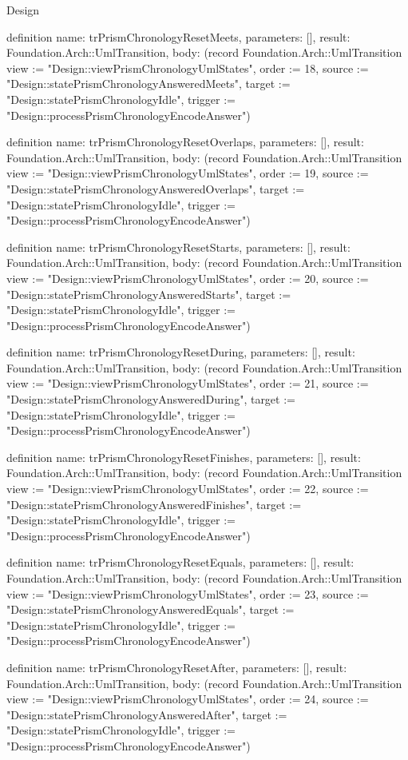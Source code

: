\begin{lexlean}{Design}
\begin{semanticmodule}
definition{
  name: trPrismChronologyResetMeets,
  parameters: [],
  result: Foundation.Arch::UmlTransition,
  body: (record Foundation.Arch::UmlTransition {view := "Design::viewPrismChronologyUmlStates", order := 18, source := "Design::statePrismChronologyAnsweredMeets", target := "Design::statePrismChronologyIdle", trigger := "Design::processPrismChronologyEncodeAnswer"})
}

definition{
  name: trPrismChronologyResetOverlaps,
  parameters: [],
  result: Foundation.Arch::UmlTransition,
  body: (record Foundation.Arch::UmlTransition {view := "Design::viewPrismChronologyUmlStates", order := 19, source := "Design::statePrismChronologyAnsweredOverlaps", target := "Design::statePrismChronologyIdle", trigger := "Design::processPrismChronologyEncodeAnswer"})
}

definition{
  name: trPrismChronologyResetStarts,
  parameters: [],
  result: Foundation.Arch::UmlTransition,
  body: (record Foundation.Arch::UmlTransition {view := "Design::viewPrismChronologyUmlStates", order := 20, source := "Design::statePrismChronologyAnsweredStarts", target := "Design::statePrismChronologyIdle", trigger := "Design::processPrismChronologyEncodeAnswer"})
}

definition{
  name: trPrismChronologyResetDuring,
  parameters: [],
  result: Foundation.Arch::UmlTransition,
  body: (record Foundation.Arch::UmlTransition {view := "Design::viewPrismChronologyUmlStates", order := 21, source := "Design::statePrismChronologyAnsweredDuring", target := "Design::statePrismChronologyIdle", trigger := "Design::processPrismChronologyEncodeAnswer"})
}

definition{
  name: trPrismChronologyResetFinishes,
  parameters: [],
  result: Foundation.Arch::UmlTransition,
  body: (record Foundation.Arch::UmlTransition {view := "Design::viewPrismChronologyUmlStates", order := 22, source := "Design::statePrismChronologyAnsweredFinishes", target := "Design::statePrismChronologyIdle", trigger := "Design::processPrismChronologyEncodeAnswer"})
}

definition{
  name: trPrismChronologyResetEquals,
  parameters: [],
  result: Foundation.Arch::UmlTransition,
  body: (record Foundation.Arch::UmlTransition {view := "Design::viewPrismChronologyUmlStates", order := 23, source := "Design::statePrismChronologyAnsweredEquals", target := "Design::statePrismChronologyIdle", trigger := "Design::processPrismChronologyEncodeAnswer"})
}

definition{
  name: trPrismChronologyResetAfter,
  parameters: [],
  result: Foundation.Arch::UmlTransition,
  body: (record Foundation.Arch::UmlTransition {view := "Design::viewPrismChronologyUmlStates", order := 24, source := "Design::statePrismChronologyAnsweredAfter", target := "Design::statePrismChronologyIdle", trigger := "Design::processPrismChronologyEncodeAnswer"})
}


\end{semanticmodule}
\end{lexlean}
